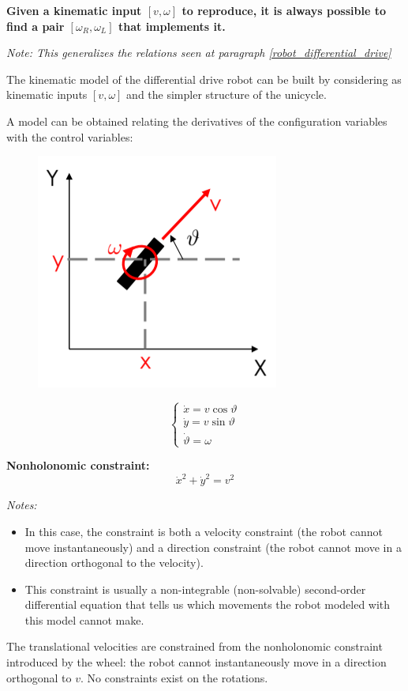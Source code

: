 \textbf{Given a kinematic input $[v, \omega]$ to reproduce, it is always possible to find a pair $[\omega_R, \omega_L]$ that implements it.}  

\textit{Note: This generalizes the relations seen at paragraph \ref{robot_differential_drive}}

The kinematic model of the differential drive robot can be built by considering as kinematic inputs $[v, \omega]$ and the simpler structure of the unicycle.  

\hfill

A model can be obtained relating the derivatives of the configuration variables with the control variables:

\begin{figure}[H]
    \centering
    \includegraphics[width=0.35\linewidth]{imgs/unicycle.png}
\end{figure}

\[
\begin{cases}
\dot{x} = v \cos \vartheta \\
\dot{y} = v \sin \vartheta \\
\dot{\vartheta} = \omega
\end{cases}
\]

\textbf{Nonholonomic constraint:}
\[
\dot{x}^2 + \dot{y}^2 = v^2
\]

\textit{Notes:}
\begin{itemize}
    \item In this case, the constraint is both a velocity constraint (the robot cannot move instantaneously) and a direction constraint (the robot cannot move in a direction orthogonal to the velocity).
    \item This constraint is usually a non-integrable (non-solvable) second-order differential equation that tells us which movements the robot modeled with this model cannot make.
\end{itemize}

The translational velocities are constrained from the nonholonomic constraint introduced by the wheel: the robot cannot instantaneously move in a direction orthogonal to $v$. No constraints exist on the rotations.

